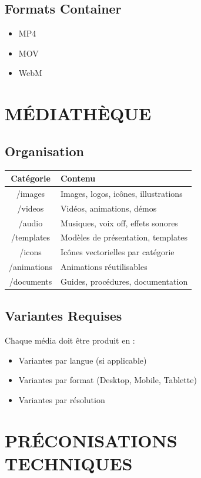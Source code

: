 \documentclass[12pt,a4paper,oneside]{book}
\begin{document}
\section{Formats Container}
\begin{itemize}
\item MP4
\item MOV
\item WebM
\end{itemize}

\chapter{MÉDIATHÈQUE}

\section{Organisation}
\bigskip
\begin{center}
\begin{tabular}{|c|p{10cm}|}
\hline
\rowcolor{or}
\color{white}\textbf{Catégorie} & \color{white}\textbf{Contenu} \\
\hline
/images & Images, logos, icônes, illustrations \\
\hline
/videos & Vidéos, animations, démos \\
\hline
/audio & Musiques, voix off, effets sonores \\
\hline
/templates & Modèles de présentation, templates \\
\hline
/icons & Icônes vectorielles par catégorie \\
\hline
/animations & Animations réutilisables \\
\hline
/documents & Guides, procédures, documentation \\
\hline
\end{tabular}
\end{center}

\section{Variantes Requises}
Chaque média doit être produit en :
\begin{itemize}
\item Variantes par langue (si applicable)
\item Variantes par format (Desktop, Mobile, Tablette)
\item Variantes par résolution
\end{itemize}

\chapter{PRÉCONISATIONS TECHNIQUES}
\end{document}
